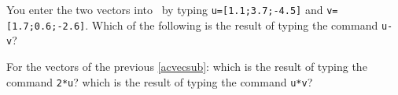 \begin{activity}\label{acvecsub}
You enter the two vectors into \script[1]\ by typing \verb|u=[1.1;3.7;-4.5]| and \verb|v=[1.7;0.6;-2.6]|.
Which of the following is the result of typing the command \verb|u-v|?
\end{activity}


\begin{activity} 
For the vectors of the previous \cref{acvecsub}:
 which is the result of typing the command \verb|2*u|? %
 which is the result of typing the command \verb|u*v|? %
\end{activity}






